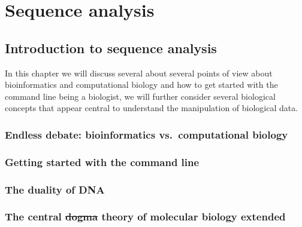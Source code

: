 \documentclass[
  letterpaper,
]{scrbook}
\begin{document}
\part{Sequence analysis}

\hypertarget{introduction-to-sequence-analysis}{%
\chapter{Introduction to sequence
analysis}\label{introduction-to-sequence-analysis}}

In this chapter we will discuss several about several points of view
about bioinformatics and computational biology and how to get started
with the command line being a biologist, we will further consider
several biological concepts that appear central to understand the
manipulation of biological data.

\hypertarget{endless-debate-bioinformatics-vs.-computational-biology}{%
\section*{Endless debate: bioinformatics vs.~computational
biology}\label{endless-debate-bioinformatics-vs.-computational-biology}}

\hypertarget{getting-started-with-the-command-line}{%
\section*{Getting started with the command
line}\label{getting-started-with-the-command-line}}

\hypertarget{the-duality-of-dna}{%
\section*{The duality of DNA}\label{the-duality-of-dna}}

\hypertarget{the-central-dogma-theory-of-molecular-biology-extended}{%
\section*{\texorpdfstring{The central \sout{dogma} theory of molecular
biology
extended}{The central dogma theory of molecular biology extended}}\label{the-central-dogma-theory-of-molecular-biology-extended}}
\end{document}
